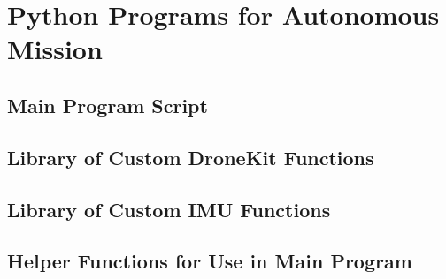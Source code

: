 \chapter{Python Programs for Autonomous Mission}
\label{app:main-code}

\section{Main Program Script}
\lstset{style=mystyle}


\clearpage
\section{Library of Custom DroneKit Functions}
\lstset{style=mystyle}


\clearpage
\section{Library of Custom IMU Functions}
\lstset{style=mystyle}


\clearpage
\section{Helper Functions for Use in Main Program}
\lstset{style=mystyle}


